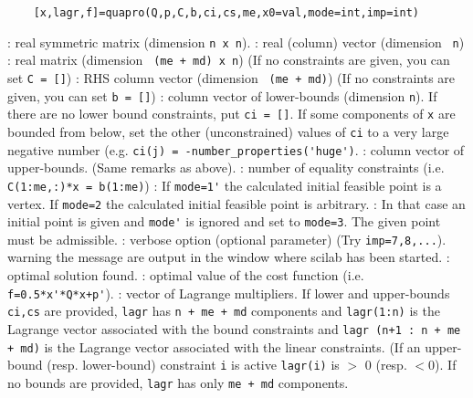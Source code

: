 
\begin{mandesc}
\end{mandesc}
\label{quapro}
\begin{calling_sequence}
  \begin{verbatim}
    [x,lagr,f]=quapro(Q,p,C,b,ci,cs,me,x0=val,mode=int,imp=int)  
  \end{verbatim}
\end{calling_sequence}
\begin{parameters}
  \begin{varlist}
    : real symmetric matrix (dimension \verb!n x n!).
    : real (column) vector (dimension \verb! n!)
    : real matrix (dimension \verb! (me + md) x n!) (If no constraints are given, you can set \verb!C = []!)
    : RHS column vector (dimension \verb! (me + md)!) (If no constraints are given, you can set \verb!b = []!)
    : column vector of lower-bounds (dimension \verb!n!). If there are no lower bound constraints, put \verb!ci = []!. 
    If some components of \verb!x! are bounded from below, set the other (unconstrained) values of \verb!ci! to a very  
    large negative number (e.g. \verb!ci(j) = -number_properties('huge')!.
   : column vector of upper-bounds. (Same remarks as above).
   : number of equality constraints (i.e. \verb!C(1:me,:)*x = b(1:me)!)
   : If \verb!mode=1'! the calculated initial feasible point is a vertex. If \verb!mode=2! the calculated initial feasible point is arbitrary.
   : In that case an initial point is given and \verb!mode'! is ignored and set to \verb!mode=3!. The given point must be admissible.
   : verbose option (optional parameter)   (Try \verb!imp=7,8,...!). warning the message are output in the window where scilab has been started.
   : optimal solution found.
   : optimal value of the cost function (i.e. \verb!f=0.5*x'*Q*x+p'!).
   : vector of Lagrange multipliers.  If lower and upper-bounds \verb!ci,cs! are provided, \verb!lagr! has 
   \verb!n + me + md! components and \verb!lagr(1:n)! is the Lagrange  vector associated with the bound 
   constraints and  \verb!lagr (n+1 : n + me + md)! is the Lagrange vector associated  
   with the linear constraints. (If an upper-bound (resp. lower-bound) constraint \verb!i! is active 
   \verb!lagr(i)! is $>$ 0 (resp. $<$0). If no bounds are provided, \verb!lagr! has only \verb!me + md! components.
  \end{varlist}
\end{parameters}

